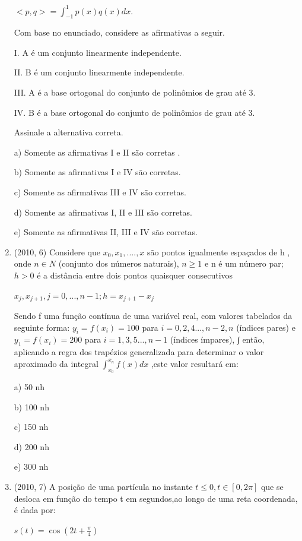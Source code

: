 \documentclass{article}
\begin{document}
\begin{enumerate}
$< p,q>= \int_{-1}^{1} p(x)q(x)dx$.

Com base no enunciado, considere as afirmativas a seguir.

I. A é um conjunto linearmente independente.

II. B é um conjunto linearmente independente.

III. A é a base ortogonal do conjunto de polinômios de grau até 3.

IV. B é a base ortogonal do conjunto de polinômios de grau até 3.

Assinale a alternativa correta.

a) Somente as afirmativas I e II são corretas .

b) Somente as afirmativas I e IV são corretas.

c) Somente as afirmativas III e IV são corretas.

d) Somente as afirmativas I, II e III são corretas.

e) Somente as afirmativas II, III e IV são corretas.



\item(2010, 6) Considere que $x_0 , x_1 , ...., x$ são pontos igualmente espaçados de h , onde $n \in N$ (conjunto dos números naturais), $n \geq 1$ e n  é um número par; $h > 0$ é a distância entre dois pontos quaisquer consecutivos

$x_j , x_{j +1} , j = 0 , ..., n - 1; h = x_{j +1} - x_j$ 

Sendo f uma função contínua de uma variável real, com valores tabelados da seguinte forma: $y_i = f ( x_i ) = 100$ para $i = 0 , 2 , 4 ..., n - 2 , n$ (índices pares) e $y_1 = f ( x_i ) = 200$ para $i = 1 , 3 , 5 ..., n - 1$ (índices ímpares), ∫ então, aplicando a regra dos trapézios generalizada para determinar o valor aproximado da integral $\int_{x_0}^{x_n} f(x) dx$ ,este valor resultará em:\newline

a) 50 nh

b) 100 nh

c) 150 nh

d) 200 nh

e) 300 nh


\item(2010, 7) A posição de uma partícula no instante $t \leq 0, t\in [0, 2\pi]$ que se desloca em função do tempo t em segundos,ao longo de uma reta coordenada, é dada por:

$s(t) = \cos{(2t + \frac{\pi}{4})}$
 

\end{enumerate}
\end{document}
